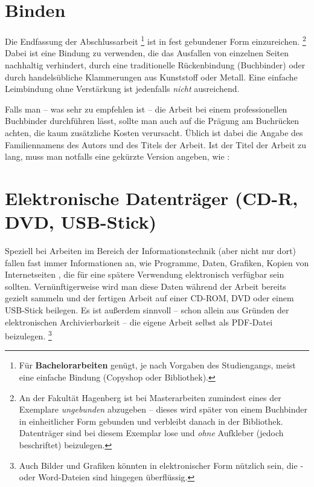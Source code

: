 \section{Binden}

Die Endfassung der Abschlussarbeit%
\footnote{Für \textbf{Bachelorarbeiten} genügt, je nach Vorgaben des Studiengangs, meist eine einfache Bindung (Copyshop oder Bibliothek).}
ist in fest gebundener Form
einzureichen.%
\footnote{An der Fakultät Hagenberg ist bei Masterarbeiten zumindest eines der
Exemplare \emph{ungebunden} abzugeben -- dieses wird später von einem
Buchbinder in einheitlicher Form gebunden und verbleibt
danach in der Bibliothek. Datenträger sind bei diesem Exemplar lose 
und \emph{ohne} Aufkleber (jedoch beschriftet) beizulegen.}
Dabei ist eine Bindung zu
verwenden, die das Ausfallen von einzelnen Seiten nachhaltig
verhindert, \zB durch eine traditionelle Rückenbindung
(Buchbinder) oder durch handelsübliche Klammerungen aus Kunststoff
oder Metall. Eine einfache Leimbindung ohne Verstärkung ist
jedenfalls \emph{nicht} ausreichend.


Falls man -- was sehr zu empfehlen ist -- die Arbeit bei einem
professionellen Buchbinder durchführen lässt, sollte man auch auf
die Prägung am Buchrücken achten, die kaum zusätzliche Kosten
verursacht. Üblich ist dabei die Angabe des Familiennamens des
Autors und des Titels der Arbeit. Ist der Titel der Arbeit zu
lang, muss man notfalls eine gekürzte  Version angeben, wie \zB:
%
\begin{center}
\setlength{\fboxsep}{3mm}
\end{center}
%



\section{Elektronische Datenträger (CD-R, DVD, USB-Stick)}
Speziell bei Arbeiten im Bereich der Informationstechnik (aber
nicht nur dort) fallen fast immer Informationen an, wie Programme,
Daten, Grafiken, Kopien von Internetseiten \usw, die für eine
spätere Verwendung elektronisch verfügbar sein sollten.
Vernünftigerweise wird man diese Daten während der Arbeit bereits
gezielt sammeln und der fertigen Arbeit auf einer CD-ROM, DVD oder
einem USB-Stick beilegen. Es ist außerdem sinnvoll -- schon allein
aus Gründen der elektronischen Archivierbarkeit -- die eigene Arbeit
selbst als PDF-Datei beizulegen.%
\footnote{Auch Bilder und Grafiken könnten in elektronischer Form nützlich
sein, die \latex- oder Word-Dateien sind hingegen überflüssig.}


